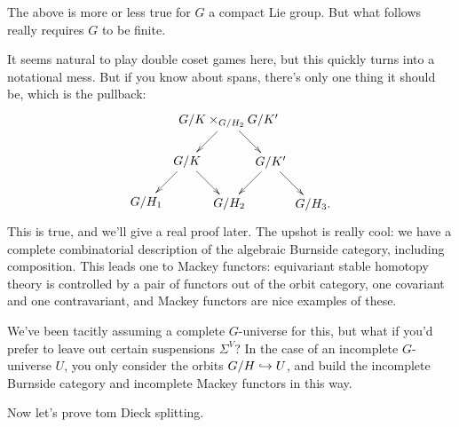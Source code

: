 The above is more or less true for $G$ a compact Lie group. But what follows really requires $G$ to be finite.

It seems natural to play double coset games here, but this quickly turns into a notational mess. But if you know
about spans, there's only one thing it should be, which is the pullback:
\[\xymatrix@dr{
	G/K\times_{G/H_2} G/K'\ar[r]\ar[d] & G/K'\ar[r]\ar[d] & G/H_3.\\
	G/K\ar[r]\ar[d] & G/H_2\\
	G/H_1
}\]
This is true, and we'll give a real proof later. The upshot is really cool: we have a complete combinatorial
description of the algebraic Burnside category, including composition. This leads one to Mackey functors:
equivariant stable homotopy theory is controlled by a pair of functors out of the orbit category, one covariant and
one contravariant, and Mackey functors are nice examples of these.
\begin{rem}
We've been tacitly assuming a complete $G$-universe for this, but what if you'd prefer to leave out certain
suspensions $\Sigma^V$? In the case of an incomplete $G$-universe $U$, you only consider the orbits $G/H\hookrightarrow U$,
and build the incomplete Burnside category and incomplete Mackey functors in this way.
\end{rem}
Now let's prove tom Dieck splitting.

